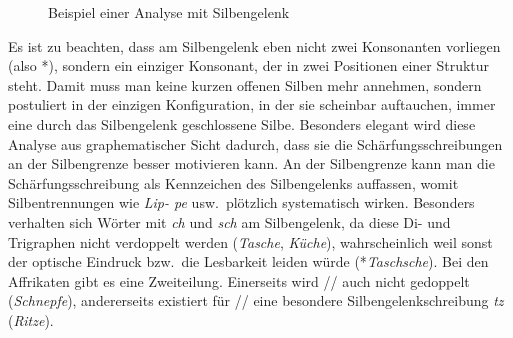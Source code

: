 
\begin{figure}[h!]
  \centering
  \caption{Beispiel einer Analyse mit Silbengelenk}
  \label{fig:silbgel001}
\end{figure}

Es ist zu beachten, dass am Silbengelenk eben nicht zwei Konsonanten vorliegen (also *\textipa{[lIp.p@]}), sondern ein einziger Konsonant, der in zwei Positionen einer Struktur steht.
Damit muss man keine kurzen offenen Silben mehr annehmen, sondern postuliert in der einzigen Konfiguration, in der sie scheinbar auftauchen, immer eine durch das Silbengelenk geschlossene Silbe.
Besonders elegant wird diese Analyse aus graphematischer Sicht dadurch, dass sie die Schärfungsschreibungen an der Silbengrenze besser motivieren kann.
An der Silbengrenze kann man die Schärfungsschreibung als Kennzeichen des Silbengelenks auffassen, womit Silbentrennungen wie \textit{Lip- pe} usw.\ plötzlich systematisch wirken.
Besonders verhalten sich Wörter mit \textit{ch} und \textit{sch} am Silbengelenk, da diese Di- und Trigraphen nicht verdoppelt werden (\textit{Tasche}, \textit{Küche}), wahrscheinlich weil sonst der optische Eindruck bzw.\ die Lesbarkeit leiden würde (*\textit{Taschsche}).
Bei den Affrikaten gibt es eine Zweiteilung.
Einerseits wird // auch nicht gedoppelt (\textit{Schnepfe}), andererseits existiert für // eine besondere Silbengelenkschreibung \textit{tz} (\textit{Ritze}).


